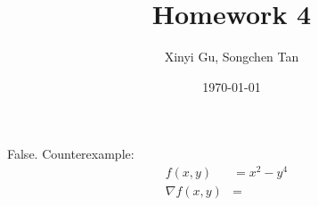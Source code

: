 \documentclass{article}
\title{Homework 4}
\author{Xinyi Gu, Songchen Tan}
\date{\today}
\begin{document}
\maketitle
\section{}


\section{}
\subsection{}
False. Counterexample:
\begin{align*}
    f(x,y) & = x^2 - y^4 &\\
    \nabla f(x,y) & = \ &\\
    
\end{align*}
\end{document}
